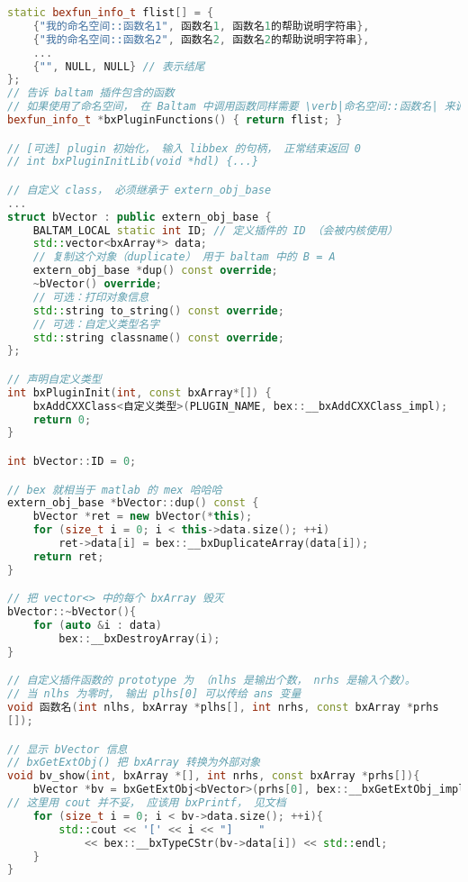 \begin{lstlisting}[language=cpp,caption=vector 插件的 main.cpp]
static bexfun_info_t flist[] = {
    {"我的命名空间::函数名1", 函数名1, 函数名1的帮助说明字符串},
    {"我的命名空间::函数名2", 函数名2, 函数名2的帮助说明字符串},
    ...
    {"", NULL, NULL} // 表示结尾
};
// 告诉 baltam 插件包含的函数
// 如果使用了命名空间， 在 Baltam 中调用函数同样需要 \verb|命名空间::函数名| 来调用
bexfun_info_t *bxPluginFunctions() { return flist; }

// [可选] plugin 初始化， 输入 libbex 的句柄， 正常结束返回 0
// int bxPluginInitLib(void *hdl) {...}

// 自定义 class， 必须继承于 extern_obj_base
...
struct bVector : public extern_obj_base {
    BALTAM_LOCAL static int ID; // 定义插件的 ID （会被内核使用）
    std::vector<bxArray*> data;
    // 复制这个对象（duplicate） 用于 baltam 中的 B = A
    extern_obj_base *dup() const override;
    ~bVector() override;
    // 可选：打印对象信息
    std::string to_string() const override;
    // 可选：自定义类型名字
    std::string classname() const override;
};

// 声明自定义类型
int bxPluginInit(int, const bxArray*[]) {
    bxAddCXXClass<自定义类型>(PLUGIN_NAME, bex::__bxAddCXXClass_impl);
    return 0;
}

int bVector::ID = 0;

// bex 就相当于 matlab 的 mex 哈哈哈
extern_obj_base *bVector::dup() const {
    bVector *ret = new bVector(*this);
    for (size_t i = 0; i < this->data.size(); ++i)
        ret->data[i] = bex::__bxDuplicateArray(data[i]);
    return ret;
}

// 把 vector<> 中的每个 bxArray 毁灭
bVector::~bVector(){
    for (auto &i : data)
        bex::__bxDestroyArray(i);
}

// 自定义插件函数的 prototype 为 （nlhs 是输出个数， nrhs 是输入个数）。
// 当 nlhs 为零时， 输出 plhs[0] 可以传给 ans 变量
void 函数名(int nlhs, bxArray *plhs[], int nrhs, const bxArray *prhs
[]);

// 显示 bVector 信息
// bxGetExtObj() 把 bxArray 转换为外部对象
void bv_show(int, bxArray *[], int nrhs, const bxArray *prhs[]){
    bVector *bv = bxGetExtObj<bVector>(prhs[0], bex::__bxGetExtObj_impl);
// 这里用 cout 并不妥， 应该用 bxPrintf， 见文档
    for (size_t i = 0; i < bv->data.size(); ++i){
        std::cout << '[' << i << "]    "
            << bex::__bxTypeCStr(bv->data[i]) << std::endl;
    }
}
\end{lstlisting}

